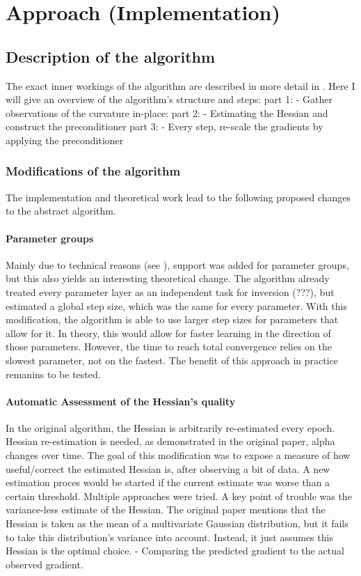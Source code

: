 \documentclass[twoside,12pt,a4paper]{report}
\begin{document}
\chapter{Approach (Implementation)}
\section{Description of the algorithm}
The exact inner workings of the algorithm are described in more detail in \cite{de2019active}.
Here I will give an overview of the algorithm's structure and steps:
part 1: - Gather observations of the curvature in-place:
part 2: - Estimating the Hessian and construct the preconditioner
part 3: - Every step, re-scale the gradients by applying the preconditioner

\subsection{Modifications of the algorithm}
The implementation and theoretical work lead to the following proposed changes to the abstract algorithm.
\subsubsection{Parameter groups}
Mainly due to technical reasons (see ), support was added for parameter groups, but this also yields an interesting theoretical change. The algorithm already treated every parameter layer as an independent task for inversion (???), but estimated a global step size, which was the same for every parameter. With this modification, the algorithm is able to use larger step sizes for parameters that allow for it. In theory, this would allow for faster learning in the direction of those parameters. However, the time to reach total convergence relies on the slowest parameter, not on the fastest. The benefit of this approach in practice remanins to be tested.
\subsubsection{Automatic Assessment of the Hessian's quality}
In the original algorithm, the Hessian is arbitrarily re-estimated every epoch. Hessian re-estimation is needed, as demonstrated in the original paper, alpha changes over time. The goal of this modification was to expose a measure of how useful/correct the estimated Hessian is, after observing a bit of data. A new estimation proces would be started if the current estimate was worse than a certain threshold. Multiple approaches were tried. A key point of trouble was the variance-less estimate of the Hessian. The original paper mentions that the Hessian is taken as the mean of a multivariate Gaussian distribution, but it fails to take this distribution's variance into account. Instead, it just assumes this Hessian is the optimal choice.
- Comparing the predicted gradient to the actual observed gradient.
\end{document}
